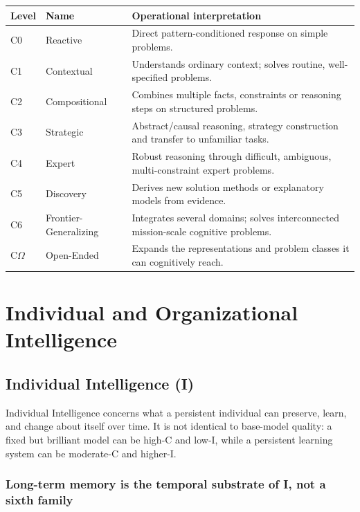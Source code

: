 \documentclass[11pt]{article}
\theoremstyle{definition}
\newcommand{\Om}{\ensuremath{\Omega}}
\begin{document}
\begin{table}[h]
\centering\small
\begin{tabularx}{\textwidth}{@{}llY@{}}
\toprule
Level & Name & Operational interpretation \\
\midrule
C0 & Reactive & Direct pattern-conditioned response on simple problems. \\
C1 & Contextual & Understands ordinary context; solves routine, well-specified problems. \\
C2 & Compositional & Combines multiple facts, constraints or reasoning steps on structured problems. \\
C3 & Strategic & Abstract/causal reasoning, strategy construction and transfer to unfamiliar tasks. \\
C4 & Expert & Robust reasoning through difficult, ambiguous, multi-constraint expert problems. \\
C5 & Discovery & Derives new solution methods or explanatory models from evidence. \\
C6 & Frontier-Generalizing & Integrates several domains; solves interconnected mission-scale cognitive problems. \\
C\Om{} & Open-Ended & Expands the representations and problem classes it can cognitively reach. \\
\bottomrule
\end{tabularx}
\end{table}

\section{Individual and Organizational Intelligence}

\subsection{Individual Intelligence (I)}\label{sec:memory}

Individual Intelligence concerns what a persistent individual can preserve, learn, and change about itself over time. It is not identical to base-model quality: a fixed but brilliant model can be high-C and low-I, while a persistent learning system can be moderate-C and higher-I.

\subsubsection{Long-term memory is the temporal substrate of I, not a sixth family}
\end{document}
